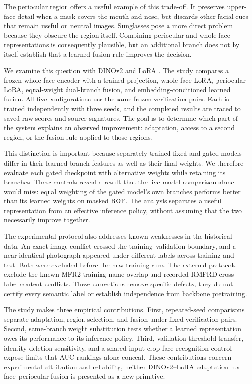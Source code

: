 \documentclass[12pt,a4paper,oneside]{report}
\begin{document}
The periocular region offers a useful example of this trade-off. It preserves upper-face detail when a mask covers the mouth and nose, but discards other facial cues that remain useful on neutral images. Sunglasses pose a more direct problem because they obscure the region itself. Combining periocular and whole-face representations is consequently plausible, but an additional branch does not by itself establish that a learned fusion rule improves the decision.

We examine this question with DINOv2 \cite{dinov2} and LoRA \cite{lora}. The study compares a frozen whole-face encoder with a trained projection, whole-face LoRA, periocular LoRA, equal-weight dual-branch fusion, and embedding-conditioned learned fusion. All five configurations use the same frozen verification pairs. Each is trained independently with three seeds, and the completed results are traced to saved raw scores and source signatures. The goal is to determine which part of the system explains an observed improvement: adaptation, access to a second region, or the fusion rule applied to those regions.

This distinction is important because separately trained fixed and gated models differ in their learned branch features as well as their final weights. We therefore evaluate each gated checkpoint with alternative weights while retaining its branches. These controls reveal a result that the five-model comparison alone would miss: equal weighting of the gated model's own branches performs better than its learned weights on masked ROF. The analysis separates a useful representation from an effective inference policy, without assuming that the two necessarily improve together.

The experimental protocol also addresses known weaknesses in the historical data. An exact image conflict crossed the training--validation boundary, and a near-identical photograph appeared under different labels across training and test. Both were excluded before the new training runs. The external protocols exclude the known MFR2 training-name overlap and recorded RMFRD cross-label content conflicts. These corrections remove specific defects; they do not certify every semantic label or establish independence from backbone pretraining.

The study makes three empirical contributions. First, repeated-seed comparisons separate adaptation, region selection, and fusion under fixed verification pairs. Second, same-branch weight substitution tests whether a learned representation owes its performance to its inference policy. Third, validation-threshold transfer, identity-deletion sensitivity, and a shared-input-crop face-recognition control expose limits that AUC rankings alone conceal. These contributions concern experimental attribution and reliability; neither DINOv2--LoRA adaptation nor face--periocular fusion is presented as a new primitive.
\end{document}
